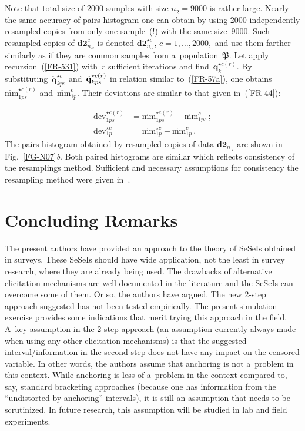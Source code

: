 \begin{multicols}{2}
Note that total size of 2000 samples with size $n_{\dot 2}=9000$ is rather large. Nearly the same
accuracy of pairs histogram one can obtain by using 2000 independently resampled copies from only one
sample~(!) with the same size~9000. Such resampled copies of $\mathbf{d2}_{n_{\cdot 2}}^c$ is denoted
$\mathbf{d2}_{n_{\cdot 2}}^{\star c}$, $c=1, \ldots, 2000,$ and use them farther similarly as if they are common samples
from  a~population~$\mathfrak{P}$. Let apply recursion~(\ref{FR-531}) with~$r$ sufficient  iterations and 
find~$\mathbf{q}_k^{\star c(r)}.$ By substituting~$\check{\mathbf{q}}_{kps}^{\star c}$ 
and~$\check{\bf q}_{kps}^{\star c(r)}$
in relation similar to~(\ref{FR-57a}), one obtains~$\check{\mathrm{mm}}_{1ps}^{\star c(r)}$ 
and~$\check{\mathrm{mm}}_{1p}^c.$
Their deviations are similar to that given in~(\ref{FR-44}):

\noindent
\begin{align*}
\mathrm{dev}_{1 ps}^{\star c(r)}&= \check{\mathrm{mm}}_{1ps}^{\star c(r)}- \check{\mathrm{mm}}_{1ps}^c\,; 
\\
\mathrm{dev}_{1 p}^{\star c}&= \check{\mathrm{mm}}_{1p}^{\star c}- \check{\mathrm{mm}}_{1p}^c\,.
\end{align*}
The pairs histogram obtained by resampled copies of data
  $\mathbf{d2}_{n_{\cdot 2}}$ are shown in Fig.~\ref{FG-N07}\textit{b}. 
  Both paired histograms are similar which reflects consistency of the resamplings  method.
Sufficient and necessary assumptions for consistency the  resampling method were 
given in~\cite{BK:BN97, BK:BE03}.



\vspace*{-6pt}

\section{Concluding Remarks}

\noindent
The present authors have provided an approach to the theory of SeSeIs obtained
in surveys. These SeSeIs should have wide application, not the least in survey research, where
they are already being used.
The drawbacks of alternative elicitation mechanisms are well-documented in the literature and
the SeSeIs can overcome some of them.   Or so, the authors have argued. The new 2-step approach suggested
has not been tested empirically. The present simulation exercise provides some indications that merit
trying this approach in the field. A~key assumption in the 2-step approach (an assumption
currently always made when using any other elicitation mechanisms) is that the suggested
interval/information in the second step does not have any impact on the censored variable.
In other words, the authors assume that anchoring is not a~problem in this context. While anchoring
is less of a~problem in the context compared to, say,  standard bracketing approaches
(because one has information from the ``undistorted by anchoring'' intervals), it is
still an assumption that needs to be scrutinized. In future research,
this assumption will be studied in lab and field experiments.




\end{multicols}
